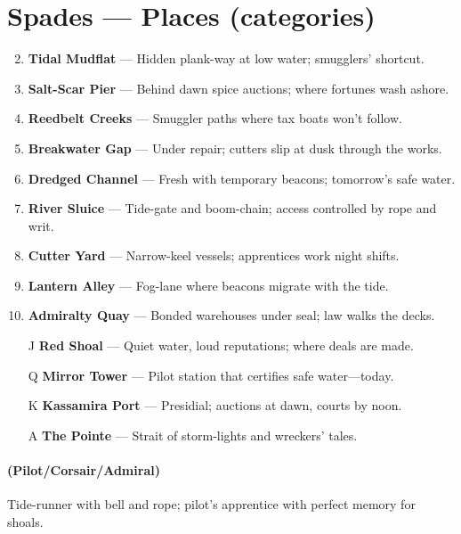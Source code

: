 \section*{Spades --- Places (categories)}
\label{sec:kahfagia-places}
\begin{enumerate}
\setcounter{enumi}{1}
\item \textbf{Tidal Mudflat} --- Hidden plank-way at low water; smugglers' shortcut.
\item \textbf{Salt-Scar Pier} --- Behind dawn spice auctions; where fortunes wash ashore.
\item \textbf{Reedbelt Creeks} --- Smuggler paths where tax boats won't follow.
\item \textbf{Breakwater Gap} --- Under repair; cutters slip at dusk through the works.
\item \textbf{Dredged Channel} --- Fresh with temporary beacons; tomorrow's safe water.
\item \textbf{River Sluice} --- Tide-gate and boom-chain; access controlled by rope and writ.
\item \textbf{Cutter Yard} --- Narrow-keel vessels; apprentices work night shifts.
\item \textbf{Lantern Alley} --- Fog-lane where beacons migrate with the tide.
\item \textbf{Admiralty Quay} --- Bonded warehouses under seal; law walks the decks.
\item[J] \textbf{Red Shoal} --- Quiet water, loud reputations; where deals are made.
\item[Q] \textbf{Mirror Tower} --- Pilot station that certifies safe water---today.
\item[K] \textbf{Kassamira Port} --- Presidial; auctions at dawn, courts by noon.
\item[A] \textbf{The Pointe} --- Strait of storm-lights and wreckers' tales.
\end{enumerate}

\paragraph*{(Pilot/Corsair/Admiral)} Tide-runner with bell and rope; pilot's apprentice with perfect memory for shoals.

